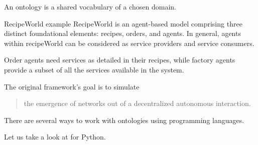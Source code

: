 \begin{frame}[fragile]{\insertsection}
    An ontology is a \alert{shared} vocabulary of a chosen domain.

\end{frame}

\begin{frame}[fragile]{\insertsection}
\end{frame}

\begin{frame}[fragile]{\insertsection}
    \begin{block}{RecipeWorld example}
        RecipeWorld \cite{Fontana2015recipeWorld} is an agent-based model comprising three distinct foundational elements: recipes, orders, and agents. In general, agents within recipeWorld can be considered as \alert{service providers} and \alert{service consumers}.

        \medskip
        \alert{Order} agents need services as detailed in their recipes, while \alert{factory} agents provide a subset of all the services available in the system.

        \medskip
        The original framework's goal is to simulate \blockquote[\cite{Fontana2015recipeWorld}]{the emergence of networks out of a decentralized autonomous interaction.}
    \end{block}
\end{frame}


\begin{frame}{\insertsection}
    There are several ways to work with ontologies using programming languages. 
    
    Let us take a look at  for Python.
\end{frame}

